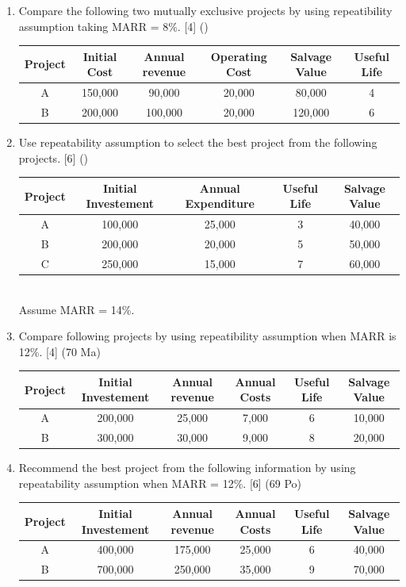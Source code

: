 \documentclass[12pt]{article}
\begin{document}
\begin{enumerate}
		\item Compare the following two mutually exclusive projects by using repeatibility assumption taking MARR = 8\%. \hfill [4] () \\
		\begin{tabular}{|c|c|c|c|c|c|}
			\hline
			Project & Initial Cost & Annual revenue & Operating Cost & Salvage Value & Useful Life \\ \hline
			A & 150,000 & 90,000 & 20,000 & 80,000 & 4 \\ \hline
			B & 200,000 & 100,000 & 20,000 & 120,000 & 6 \\ \hline
		\end{tabular}
		
		\item Use repeatability assumption to select the best project from the following projects. \hfill [6] ()
		\begin{tabular}{|c|c|c|c|c|}
			\hline
			Project & Initial Investement & Annual Expenditure & Useful Life & Salvage Value \\ \hline
			A & 100,000 & 25,000 & 3 & 40,000 \\ \hline
			B & 200,000 & 20,000 & 5 & 50,000 \\ \hline
			C & 250,000 & 15,000 & 7 & 60,000 \\ \hline
		\end{tabular}\\
		Assume MARR = 14\%.
		
		\item Compare following projects by using  repeatibility assumption when MARR is 12\%. \hfill [4] (70 Ma)\\
		\begin{tabular}{|c|c|c|c|c|c|}
			\hline
			Project & Initial Investement & Annual revenue & Annual Costs & Useful Life & Salvage Value \\ \hline
			A & 200,000 & 25,000 & 7,000 & 6 & 10,000 \\ \hline
			B & 300,000 & 30,000 & 9,000 & 8 & 20,000 \\ \hline
		\end{tabular}
		
		\item Recommend the best project from the following information by using repeatability assumption when MARR = 12\%. \hfill [6] (69 Po)\\
		\begin{tabular}{|c|c|c|c|c|c|}
			\hline
			Project & Initial Investement & Annual revenue & Annual Costs & Useful Life & Salvage Value \\ \hline
			A & 400,000 & 175,000 & 25,000 & 6 & 40,000 \\ \hline
			B & 700,000 & 250,000 & 35,000 & 9 & 70,000 \\ \hline
		\end{tabular}
		

\end{enumerate}
\end{document}
